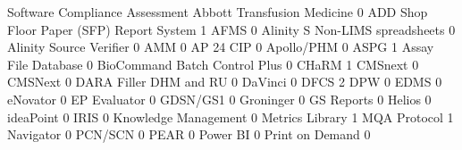 \documentclass{article}
\begin{document}
\begin{Schunk}
\begin{Soutput}
                                           Software Compliance Assessment
  Abbott Transfusion Medicine                                           0
  ADD Shop Floor Paper (SFP) Report System                              1
  AFMS                                                                  0
  Alinity S Non-LIMS spreadsheets                                       0
  Alinity Source Verifier                                               0
  AMM                                                                   0
  AP 24 CIP                                                             0
  Apollo/PHM                                                            0
  ASPG                                                                  1
  Assay File Database                                                   0
  BioCommand Batch Control Plus                                         0
  CHaRM                                                                 1
  CMSnext                                                               0
  CMSNext                                                               0
  DARA Filler DHM and RU                                                0
  DaVinci                                                               0
  DFCS                                                                  2
  DPW                                                                   0
  EDMS                                                                  0
  eNovator                                                              0
  EP Evaluator                                                          0
  GDSN/GS1                                                              0
  Groninger                                                             0
  GS Reports                                                            0
  Helios                                                                0
  ideaPoint                                                             0
  IRIS                                                                  0
  Knowledge Management                                                  0
  Metrics Library                                                       1
  MQA Protocol                                                          1
  Navigator                                                             0
  PCN/SCN                                                               0
  PEAR                                                                  0
  Power BI                                                              0
  Print on Demand                                                       0

\end{Soutput}
\end{Schunk}
\end{document}
